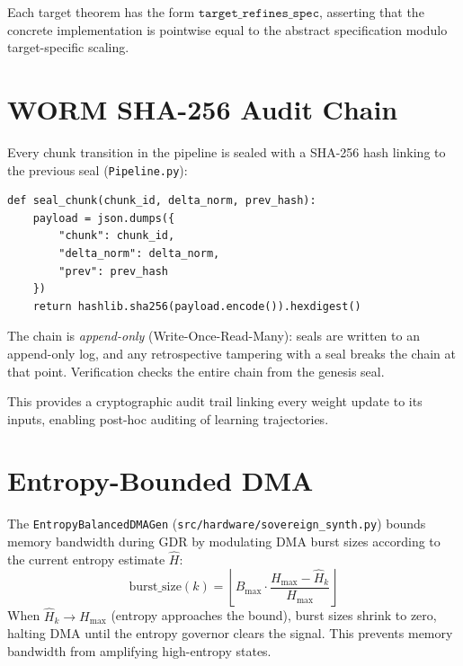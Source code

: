 \documentclass[10pt,conference]{IEEEtran}
\begin{document}
Each target theorem has the form $\texttt{target\_refines\_spec}$, asserting
that the concrete implementation is pointwise equal to the abstract specification
modulo target-specific scaling.


\section{WORM SHA-256 Audit Chain}
\label{sec:worm}

Every chunk transition in the pipeline is sealed with a SHA-256 hash linking
to the previous seal (\texttt{Pipeline.py}):

\begin{lstlisting}[style=cuda,caption={WORM routing seal (schematic Python)}]
def seal_chunk(chunk_id, delta_norm, prev_hash):
    payload = json.dumps({
        "chunk": chunk_id,
        "delta_norm": delta_norm,
        "prev": prev_hash
    })
    return hashlib.sha256(payload.encode()).hexdigest()
\end{lstlisting}

The chain is \emph{append-only} (Write-Once-Read-Many): seals are written to
an append-only log, and any retrospective tampering with a seal breaks the chain
at that point. Verification checks the entire chain from the genesis seal.

This provides a cryptographic audit trail linking every weight update to its
inputs, enabling post-hoc auditing of learning trajectories.


\section{Entropy-Bounded DMA}
\label{sec:entropy}

The \texttt{EntropyBalancedDMAGen} (\texttt{src/hardware/sovereign\_synth.py})
bounds memory bandwidth during GDR by modulating DMA burst sizes according to
the current entropy estimate $\hat{H}$:
\[
  \text{burst\_size}(k) = \left\lfloor B_{\max} \cdot
    \frac{H_{\max} - \hat{H}_k}{H_{\max}} \right\rfloor
\]
When $\hat{H}_k \to H_{\max}$ (entropy approaches the bound), burst sizes
shrink to zero, halting DMA until the entropy governor clears the signal.
This prevents memory bandwidth from amplifying high-entropy states.
\end{document}
